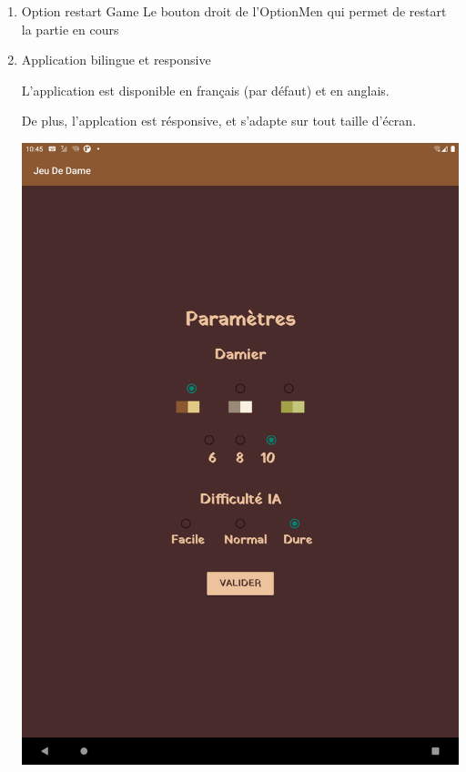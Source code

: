 \documentclass{article}
\begin{document}
\begin{enumerate}
\item Option restart Game
Le bouton droit de l'OptionMen qui permet de restart la partie en cours

\item Application bilingue et responsive

L'application est disponible en français (par défaut) et en anglais.

De plus, l'applcation est résponsive, et s'adapte sur tout taille d'écran.

\begin{center}
  \includegraphics[scale=0.1]{setting_tablet_fr.png}

\end{center}
\end{enumerate}
\end{document}
